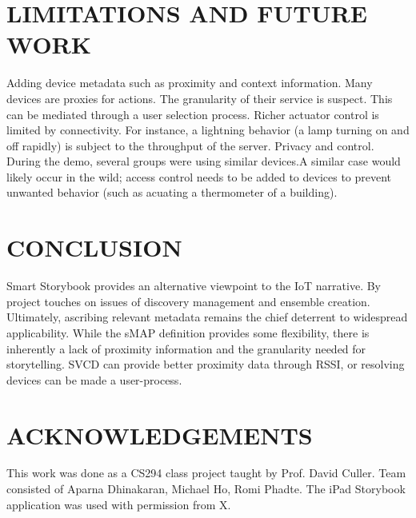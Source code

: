 \documentclass{sigchi}
\begin{document}
\section{LIMITATIONS AND FUTURE WORK}
Adding device metadata such as proximity and context information. Many devices are proxies for actions. The granularity of their service is suspect. This can be mediated through a user selection process. 
Richer actuator control is limited by connectivity. For instance, a lightning behavior (a lamp turning on and off rapidly) is subject to the throughput of the server.
Privacy and control. During the demo, several groups were using similar devices.A similar case would likely occur in the wild; access control needs to be added to devices to prevent unwanted behavior (such as acuating a thermometer of a building). 

\section{CONCLUSION}
Smart Storybook provides an alternative viewpoint to the IoT narrative. By project touches on issues of discovery management and ensemble creation. Ultimately, ascribing relevant metadata remains the chief deterrent to widespread applicability. While the sMAP definition provides some flexibility,  there is inherently a lack of proximity information and the granularity needed for storytelling. SVCD can provide better proximity data through RSSI, or resolving devices can be made a user-process.


\section{ACKNOWLEDGEMENTS}
This work was done as a CS294 class project taught by Prof. David Culler. 
Team consisted of Aparna Dhinakaran, Michael Ho, Romi Phadte. 
The iPad Storybook application was used with permission from X. 

\balance


\end{document}
